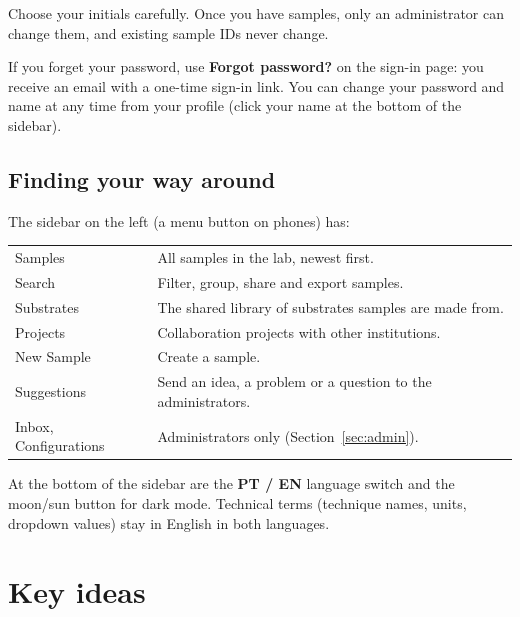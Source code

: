 \documentclass[11pt,a4paper]{article}
\newcommand{\ui}[1]{\textsf{\textbf{#1}}}
\newcommand{\menu}[1]{\textsf{#1}}
\begin{document}
\begin{careful}
Choose your initials carefully. Once you have samples, only an
administrator can change them, and existing sample IDs never change.
\end{careful}

If you forget your password, use \ui{Forgot password?} on the sign-in page:
you receive an email with a one-time sign-in link. You can change your
password and name at any time from your profile (click your name at the
bottom of the sidebar).

\subsection{Finding your way around}

The sidebar on the left (a menu button on phones) has:

\begin{center}
\begin{tabularx}{\linewidth}{@{}lX@{}}
\toprule
\menu{Samples}     & All samples in the lab, newest first. \\
\menu{Search}      & Filter, group, share and export samples. \\
\menu{Substrates}  & The shared library of substrates samples are made from. \\
\menu{Projects}    & Collaboration projects with other institutions. \\
\menu{New Sample}  & Create a sample. \\
\menu{Suggestions} & Send an idea, a problem or a question to the administrators. \\
\menu{Inbox}, \menu{Configurations} & Administrators only (Section~\ref{sec:admin}). \\
\bottomrule
\end{tabularx}
\end{center}

At the bottom of the sidebar are the \ui{PT / EN} language switch and the
moon/sun button for dark mode. Technical terms (technique names, units,
dropdown values) stay in English in both languages.

\section{Key ideas}
\end{document}
